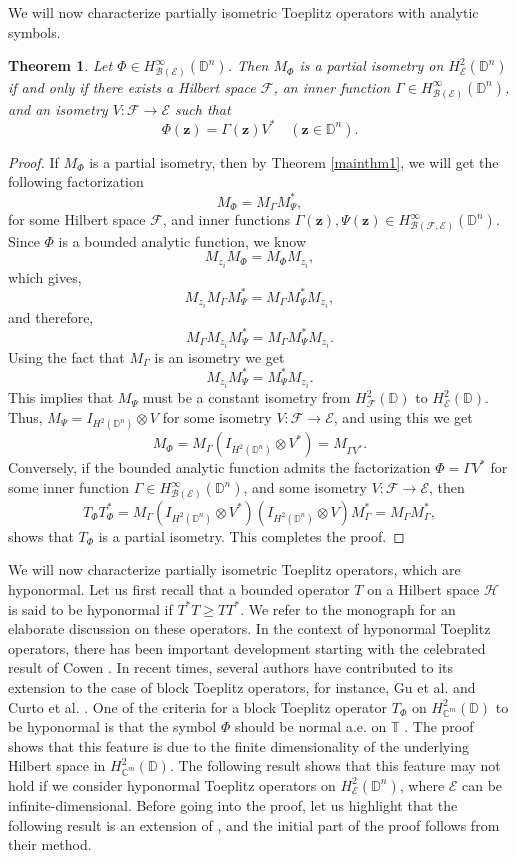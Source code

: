 \documentclass[12pt]{amsart}
\newtheorem{thm}[propn]{Theorem}
\theoremstyle{definition}
\newcommand{\D}{\mathbb{D}}
\newcommand{\1}{{\mbox{\bf 1}}}
\newcommand{\clb}{\mathcal{B}}
\newcommand{\cle}{\mathcal{E}}
\newcommand{\clf}{\mathcal{F}}
\newcommand{\clh}{\mathcal{H}}
\newcommand{\raro}{\rightarrow}
\begin{document}
We will now characterize partially isometric Toeplitz operators with analytic symbols.
\begin{thm}\label{main_analytic}
Let $\Phi \in H_{\clb(\cle)}^{\infty}(\D^n)$. Then $M_{\Phi}$ is a partial isometry on $H_{\cle}^2(\D^n)$ if and only if there exists a Hilbert space $\clf$, an inner function $ \Gamma \in H_{\clb(\cle)}^{\infty}(\D^n)$, and an isometry $V: \clf \raro \cle$ such that 
\[
\Phi(\bm{z}) = \Gamma(\bm{z}) V^* \quad (\bm{z} \in \D^n).
\]
\end{thm}
\begin{proof}
If $M_{\Phi}$ is a partial isometry, then by Theorem \ref{mainthm1}, we will get the following factorization
\[
M_{\Phi} = M_{\Gamma}M_{\Psi}^*,
\]
for some Hilbert space $\clf$, and inner functions $\Gamma(\bm{z}), \Psi(\bm{z}) \in H_{\clb(\clf,\cle)}^{\infty}(\D^n)$. Since $\Phi$ is a bounded analytic function, we know
\[
M_{z_i} M_{\Phi} = M_{\Phi} M_{z_i},
\]
which gives,
\[
M_{z_i} M_{\Gamma}  M_{\Psi}^* = M_{\Gamma} M_{\Psi}^* M_{z_i},
\]
and therefore,
\[
M_{\Gamma} M_{z_i} M_{\Psi}^* = M_{\Gamma} M_{\Psi}^* M_{z_i}.
\]
Using the fact that $M_{\Gamma}$ is an isometry we get
\[
M_{z_i} M_{\Psi}^* =  M_{\Psi}^* M_{z_i}.
\]
This implies that $M_{\Psi}$ must be a constant isometry from $H_{\clf}^2(\D)$ to $H_{\cle}^2(\D)$.  Thus, $M_{\Psi} = I_{H^2(\D^n)} \otimes V$ for some isometry $V: \clf \raro \cle$, and using this we get
\[
M_{\Phi} = M_{\Gamma} (I_{H^2(\D^n)} \otimes V^*) = M_{\Gamma V^*}.
\]
Conversely, if the bounded analytic function admits the factorization $\Phi = \Gamma V^*$ for some inner function $\Gamma \in H_{\clb(\cle)}^{\infty}(\D^n)$, and some isometry $V:\clf \raro \cle$, then 
\[
T_{\Phi}T_{\Phi}^* = M_{\Gamma} (I_{H^2(\D^n)} \otimes V^*) (I_{H^2(\D^n)} \otimes V)M_{\Gamma}^* = M_{\Gamma} M_{\Gamma}^*,
\]
shows that $T_{\Phi}$ is a partial isometry. This completes the proof.
\end{proof}
We will now characterize partially isometric Toeplitz operators, which are hyponormal.  Let us first recall that a bounded operator $T$ on a Hilbert space $\clh$ is said to be hyponormal if $T^*T \geq TT^*$. We refer to the monograph \cite{MP} for an elaborate discussion on these operators. In the context of hyponormal Toeplitz operators, there has been important development starting with the celebrated result of Cowen \cite{Cowen}. In recent times, several authors have contributed to its extension to the case of block Toeplitz operators, for instance, Gu et al. \cite{GHR} and Curto et al. \cite{CHL4}. One of the criteria for a block Toeplitz operator $T_{\Phi}$ on $H_{\mathbb{C}^m}^2(\D)$ to be hyponormal is that the symbol $\Phi$ should be normal a.e. on $\mathbb{T}$ \cite[Theorem 3.3]{GHR}.  The proof shows that this feature is due to the finite dimensionality of the underlying Hilbert space in $H_{\mathbb{C}^m}^2(\D)$. The following result shows that this feature may not hold if we consider hyponormal Toeplitz operators on $H_{\cle}^2(\D^n)$, where $\cle$ can be infinite-dimensional. Before going into the proof, let us highlight that the following result is an extension of \cite[Corollary 5.1]{KPS}, and the initial part of the proof follows from their method.
\end{document}
